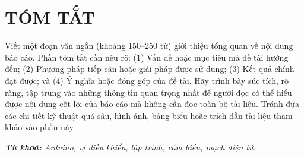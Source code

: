 \section*{TÓM TẮT}

{}

Viết một đoạn văn ngắn (khoảng 150–250 từ) giới thiệu tổng quan về nội dung báo cáo. Phần tóm tắt cần nêu rõ: (1) Vấn đề hoặc mục tiêu mà đề tài hướng đến; (2) Phương pháp tiếp cận hoặc giải pháp được sử dụng; (3) Kết quả chính đạt được; và (4) Ý nghĩa hoặc đóng góp của đề tài. Hãy trình bày súc tích, rõ ràng, tập trung vào những thông tin quan trọng nhất để người đọc có thể hiểu được nội dung cốt lõi của báo cáo mà không cần đọc toàn bộ tài liệu. Tránh đưa các chi tiết kỹ thuật quá sâu, hình ảnh, bảng biểu hoặc trích dẫn tài liệu tham khảo vào phần này.

\textbf{\textit{Từ khoá:}} \textit{Arduino, vi điều khiển, lập trình, cảm biến, mạch điện tử.}
\newpage
\cleardoublepage